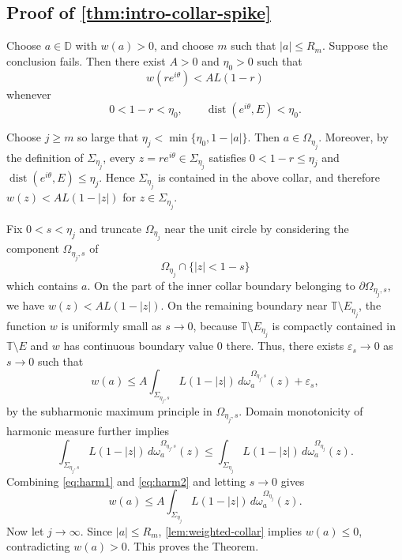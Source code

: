 \documentclass[11pt]{amsart}
\numberwithin{equation}{section}
\theoremstyle{definition}
\newcommand{\dist}{\operatorname{dist}}
\newcommand{\D}{\mathbb D}
\newcommand{\T}{\mathbb T}
\begin{document}
\subsection{Proof of \cref{thm:intro-collar-spike}}
Choose $a\in\D$ with $w(a)>0$, and choose $m$ such that $|a|\le R_m$.
Suppose the conclusion fails. Then there exist $A>0$ and $\eta_0>0$
such that
$$
        w(re^{i\theta})<A L(1-r)
$$
whenever
$$
        0<1-r<\eta_0,
        \qquad
        \dist(e^{i\theta},E)<\eta_0.
$$

Choose $j\ge m$ so large that
$
        \eta_j<\min\{\eta_0,1-|a|\}.
$
Then $a\in\Omega_{\eta_j}$. Moreover, by the definition of
$\Sigma_{\eta_j}$, every $z=re^{i\theta}\in\Sigma_{\eta_j}$ satisfies
$
        0<1-r\le \eta_j$
        and
        $\dist(e^{i\theta},E)\le \eta_j$.
Hence $\Sigma_{\eta_j}$ is contained in the above collar, and therefore
$
        w(z)<A L(1-|z|)
$ for $z\in\Sigma_{\eta_j}$.

Fix $0<s<\eta_j$ and truncate $\Omega_{\eta_j}$ near the unit
circle by considering the component $\Omega_{\eta_j,s}$ of
$$
        \Omega_{\eta_j}\cap\{|z|<1-s\}
$$
which contains $a$.  On the part of the inner collar boundary belonging to
$\partial\Omega_{\eta_j,s}$, we have
$
        w(z) < A L(1-|z|)$.
On the remaining boundary near $\T\setminus E_{\eta_j}$, the function $w$
is uniformly small as $s\to 0$, because
$\T\setminus E_{\eta_j}$ is compactly contained in $\T\setminus E$ and
$w$ has continuous boundary value $0$ there. 
Thus, there exists $\varepsilon_s\to 0$ as $s\to 0$ such that 
\begin{equation} \label{eq:harm1}
        w(a)
        \le
        A\int_{\Sigma_{\eta_j,s}}
        L(1-|z|)
        \,d\omega_a^{\Omega_{\eta_j,s}}(z) + \varepsilon_s,
\end{equation}
by the subharmonic maximum principle in
$\Omega_{\eta_j,s}$. Domain monotonicity of harmonic measure further implies
\begin{equation} \label{eq:harm2}
        \int_{\Sigma_{\eta_j,s}} L(1-|z|)
        \,d\omega_a^{\Omega_{\eta_j,s}}(z)
        \le
        \int_{\Sigma_{\eta_j}} L(1-|z|)
        \,d\omega_a^{\Omega_{\eta_j}}(z).
\end{equation}
Combining \eqref{eq:harm1} and \eqref{eq:harm2} and letting $s\to 0$ gives
$$
        w(a)
        \le
        A\int_{\Sigma_{\eta_j}}
        L(1-|z|)
        \,d\omega_a^{\Omega_{\eta_j}}(z).
$$
Now let $j\to\infty$.  Since $|a|\le R_m$, \cref{lem:weighted-collar}
implies $w(a)\le0$, contradicting $w(a)>0$.  This proves the Theorem.
\end{document}
